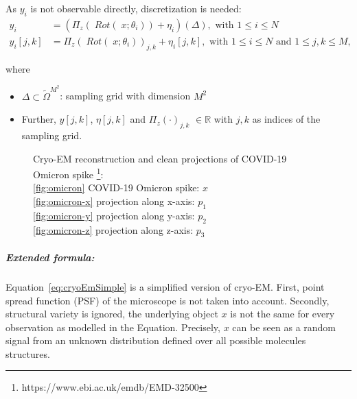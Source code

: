 As $y_i$ is not observable directly, discretization is needed:
\begin{equation}
    \label{eq:cryoEmSimpleDiscrete}
    \begin{aligned}
        y_i &= \left( \Pi_z (\; Rot (\;x; \theta_i)) + \eta_i\right)(\Delta), \text{ with } 1 \leq i \leq N \\
        y_i[j,k] &= \Pi_z (\; Rot(\;x; \theta_i))_{j,k} + \eta_i[j,k], \text{ with } 1 \leq i \leq N \text{ and } 1 \leq j,k \leq M,
    \end{aligned}
\end{equation}

where 
\begin{itemize}
    \item $\Delta \subset \tilde{\Omega}^{M^2}$: sampling grid with dimension $M^2$
    \item Further, $y[j,k]$, $\eta[j,k]$ and $\Pi_z(\cdot)_{j,k}$ $ \in \mathbb{R}$ with $j,k$ as indices of the sampling grid.
\end{itemize}


\begin{figure}[H]
    \label{fig:cryo-em-omicron}
    \hfill
    \hfill
    \hfill
    \hfill
    \hfill
	\caption{Cryo-EM reconstruction and clean projections of COVID-19 Omicron spike \protect\footnote{https://www.ebi.ac.uk/emdb/EMD-32500}: \\
    \ref{fig:omicron} COVID-19 Omicron spike: $x$ \\
    \ref{fig:omicron-x} projection along x-axis: $p_1$ \\
    \ref{fig:omicron-y} projection along y-axis: $p_2$  \\
    \ref{fig:omicron-z} projection along z-axis: $p_3$ \\
    }
\end{figure}


\subparagraph{Extended formula:} 
Equation~\ref{eq:cryoEmSimple} is a simplified version of cryo-EM.
First, point spread function (PSF) of the microscope is not taken into account.
Secondly, structural variety is ignored, the underlying object $x$ is not the same 
for every observation as modelled in the Equation. 
Precisely, $x$ can be seen as a random signal from an unknown distribution defined over all possible molecules structures.

